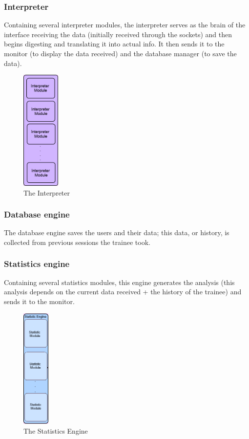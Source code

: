 \documentclass[a4paper]{article}
\begin{document}
\subsubsection{Interpreter}
Containing several interpreter modules, the interpreter serves as the brain of the interface receiving the data (initially received through the sockets) and then begins digesting and translating it into actual info. It then sends it to the monitor (to display the data received) and the database manager (to save the data).

\begin{figure}[h!]
\centering
\includegraphics[height=60mm]{Interpreter.png}
\caption{The Interpreter}
\label{threadsVsSync}
\end{figure}

\subsubsection{Database engine}
The database engine saves the users and their data; this data, or history, is collected from previous sessions the trainee took.

\subsubsection{Statistics engine}
Containing several statistics modules, this engine generates the analysis (this analysis depends on the current data received + the history of the trainee) and sends it to the monitor.

\begin{figure}[h!]
\centering
\includegraphics[height=60mm]{Statistics.png}
\caption{The Statistics Engine}
\label{threadsVsSync}
\end{figure}
\end{document}
